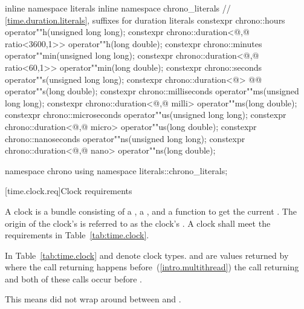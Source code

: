 \begin{codeblock}
{  inline namespace literals {
    inline namespace chrono_literals {
      // \ref{time.duration.literals}, suffixes for duration literals
      constexpr chrono::hours                                operator""h(unsigned long long);
      constexpr chrono::duration<@\unspec,@ ratio<3600,1>> operator""h(long double);
      constexpr chrono::minutes                              operator""min(unsigned long long);
      constexpr chrono::duration<@\unspec,@ ratio<60,1>>   operator""min(long double);
      constexpr chrono::seconds                              operator""s(unsigned long long);
      constexpr chrono::duration<@\unspec@> @\itcorr[-1]@               operator""s(long double);
      constexpr chrono::milliseconds                         operator""ms(unsigned long long);
      constexpr chrono::duration<@\unspec,@ milli>          operator""ms(long double);
      constexpr chrono::microseconds                         operator""us(unsigned long long);
      constexpr chrono::duration<@\unspec,@ micro>         operator""us(long double);
      constexpr chrono::nanoseconds                          operator""ns(unsigned long long);
      constexpr chrono::duration<@\unspec,@ nano>          operator""ns(long double);
    }
  }

  namespace chrono {
    using namespace literals::chrono_literals;
  }
}
\end{codeblock}

[time.clock.req]{Clock requirements}

\pnum
A clock is a bundle consisting of a , a
, and a function  to get the current .
The origin of the clock's  is referred to as the clock's .
 A clock shall meet the requirements in Table~\ref{tab:time.clock}.

\pnum
In Table~\ref{tab:time.clock}  and  denote clock types.  and
 are values returned by  where the call returning  happens
before~(\ref{intro.multithread}) the call returning  and both of these calls
occur
before .
\begin{note} This means  did not wrap around between  and
. \end{note}

